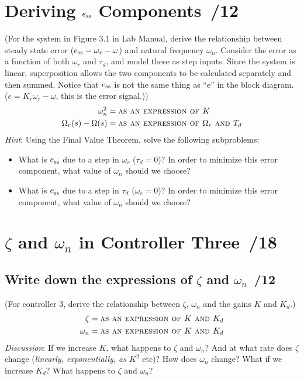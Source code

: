 \documentclass{article}
\newcommand{\score}{\hfill \underline{\hspace{0.65cm}}\,/} %
\begin{document}
\section{{\sc Deriving $e_{\rm ss}$ Components} \score 12}
(For the system in Figure 3.1 in Lab Manual, derive the relationship between steady state error ($e_{\rm ss}= \omega_r - \omega$) and natural frequency $\omega_n$. Consider the error as a function of both $\omega_r$ and $\tau_d$, and model these as step inputs. Since the system is linear, superposition allows the two components to be calculated separately and then summed. Notice that $e_{\rm ss}$ is not the same thing as ``e'' in the block diagram. ($e= K_r\omega_r - \omega$, this is the error signal.))
\begin{align*}
  \omega_n^2 & = \mbox{\sc as an expression of $K$} \\
  \Omega_r(s) - \Omega(s) & = \mbox{\sc as an expression of $\Omega_r$ and $T_d$}
\end{align*}
\emph{Hint}: Using the Final Value Theorem, solve the following subproblems:
\begin{itemize}
\item What is $e_{\rm ss}$ due to a step in $\omega_r$ ($\tau_d = 0$)? In order to minimize this error component, what value of $\omega_n$ should we choose?
\item What is $e_{\rm ss}$ due to a step in $\tau_d$ ($\omega_r = 0$)? In order to minimize this error component, what value of $\omega_n$ should we choose?
\end{itemize}

\section{{\sc $\zeta$ and $\omega_n$ in Controller Three} \score 18}
\subsection{Write down the expressions of $\zeta$ and $\omega_n$ \score 12}
(For controller 3, derive the relationship between $\zeta$, $\omega_n$ and the gains $K$ and $K_d$.)
\begin{align*}
\zeta & = \mbox{\sc as an expression of $K$ and $K_d$} \\  
\omega_n & = \mbox{\sc as an expression of $K$ and $K_d$}  
\end{align*}
\emph{Discussion}: If we increase $K$, what happens to $\zeta$ and $\omega_n$? And at what rate does $\zeta$ change (\emph{linearly, exponentially, as $K^2$} etc)? How does $\omega_n$ change? What if we increase $K_d$? What happens to $\zeta$ and $\omega_n$?
\end{document}
